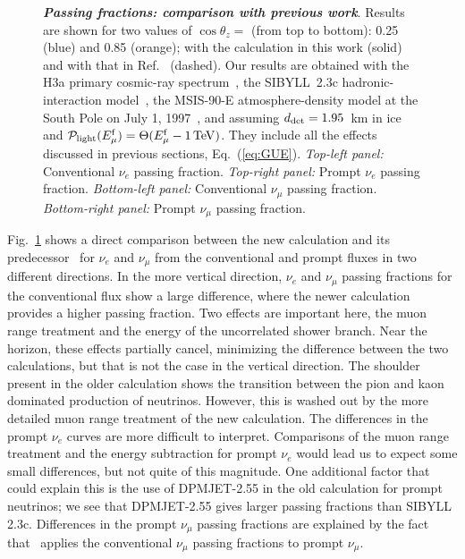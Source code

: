 \begin{figure}
{	}
	\caption{\textbf{\textit{Passing fractions: comparison with previous work}}. Results are shown for two values of $\cos\theta_z =$ (from top to bottom): 0.25 (blue) and 0.85 (orange); with the calculation in this work (solid) and with that in Ref.~\cite{Gaisser:2014bja} (dashed). Our results are obtained with the H3a primary cosmic-ray spectrum~\cite{Gaisser:2011cc}, the SIBYLL~2.3c hadronic-interaction model~\cite{Riehn:2017mfm}, the MSIS-90-E atmosphere-density model at the South Pole on July 1, 1997~\cite{Labitzke:1985, Hedin:1991}, and assuming $d_{\rm det} = 1.95$~km in ice and ${\mathcal P}_{\rm light}(E_{\mu}^{\rm f}) = \Theta(E_{\mu}^{\rm f} - 1\,{\rm TeV})$. They include all the effects discussed in previous sections, Eq.~(\ref{eq:GUE}). \textit{Top-left panel:} Conventional $\nu_e$ passing fraction. \textit{Top-right panel:} Prompt $\nu_e$ passing fraction. \textit{Bottom-left panel:} Conventional $\nu_\mu$ passing fraction. \textit{Bottom-right panel:} Prompt $\nu_\mu$ passing fraction.}
	\label{fig:nue-passing-comparison-old}
\end{figure}

Fig.~\ref{fig:nue-passing-comparison-old} shows a direct comparison between the new calculation and its predecessor~\cite{Gaisser:2014bja} for $\nu_e$ and $\nu_\mu$ from the conventional and prompt fluxes in two different directions.
In the more vertical direction, $\nu_e$ and $\nu_\mu$ passing fractions for the conventional flux show a large difference, where the newer calculation provides a higher passing fraction.
Two effects are important here, the muon range treatment and the energy of the uncorrelated shower branch.
Near the horizon, these effects partially cancel, minimizing the difference between the two calculations, but that is not the case in the vertical direction.
The shoulder present in the older calculation shows the transition between the pion and kaon dominated production of neutrinos.
However, this is washed out by the more detailed muon range treatment of the new calculation.
The differences in the prompt $\nu_e$ curves are more difficult to interpret.
Comparisons of the muon range treatment and the energy subtraction for prompt $\nu_e$ would lead us to expect some small differences, but not quite of this magnitude.
One additional factor that could explain this is the use of DPMJET-2.55 in the old calculation for prompt neutrinos; we see that DPMJET-2.55 gives larger passing fractions than SIBYLL 2.3c.
Differences in the prompt $\nu_\mu$ passing fractions are explained by the fact that~\cite{Gaisser:2014bja} applies the conventional $\nu_\mu$ passing fractions to prompt $\nu_\mu$.

